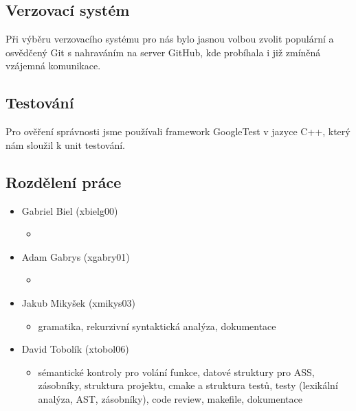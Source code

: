 \documentclass[a4paper, 12pt]{article}
\begin{document}
        \subsection{Verzovací systém}
            Při výběru verzovacího systému pro nás bylo jasnou volbou zvolit populární a osvědčený Git s nahraváním na server GitHub, kde probíhala i již zmíněná vzájemná komunikace.
        \subsection{Testování}
            Pro ověření správnosti jsme používali framework GoogleTest v jazyce C++, který nám sloužil k unit testování.
        \subsection{Rozdělení práce}
            \begin{itemize}
                \item Gabriel Biel (xbielg00)
                    \begin{itemize}
                        \item
                    \end{itemize}
                \item Adam Gabrys (xgabry01)
                    \begin{itemize}
                        \item
                    \end{itemize}
                \item Jakub Mikyšek (xmikys03)
                    \begin{itemize}
                        \item gramatika, rekurzivní syntaktická analýza, dokumentace
                    \end{itemize}
                \item David Tobolík (xtobol06)
                    \begin{itemize}
                        \item sémantické kontroly pro volání funkce, datové struktury pro ASS, zásobníky, struktura projektu, cmake a struktura testů, testy (lexikální analýza, AST, zásobníky), code review, makefile, dokumentace
                    \end{itemize}
            \end{itemize}

    \newpage
	\renewcommand{\refname}{Zdroje}
	\printbibliography
\end{document}
